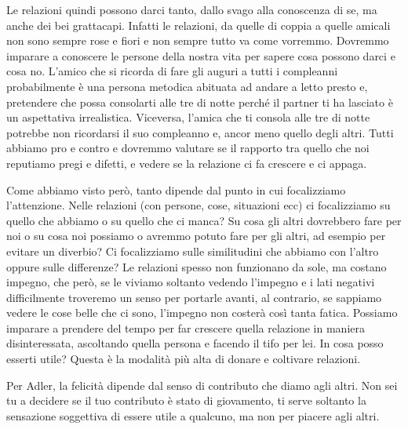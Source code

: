 \documentclass[12pt]{book} %
\begin{document}
\bigskip

Le relazioni quindi possono darci tanto, dallo svago alla conoscenza di se, ma anche dei bei grattacapi. Infatti le
relazioni, da quelle di coppia a quelle amicali non sono sempre rose e fiori e non sempre tutto va come vorremmo.
Dovremmo imparare a conoscere le persone della nostra vita per sapere cosa possono darci e cosa no.
L'amico che si ricorda di fare gli auguri a tutti i compleanni probabilmente è una persona
metodica abituata ad andare a letto presto e, pretendere che possa consolarti alle tre di notte perché il partner ti ha
lasciato è un aspettativa irrealistica. Viceversa, l'amica che ti consola alle tre di notte
potrebbe non ricordarsi il suo compleanno e, ancor meno quello degli altri. Tutti abbiamo pro e contro e dovremmo
valutare se il rapporto tra quello che noi reputiamo pregi e difetti, e vedere se la relazione ci fa crescere e ci
appaga.

Come abbiamo visto però, tanto dipende dal punto in cui focalizziamo l'attenzione. Nelle relazioni
(con persone, cose, situazioni ecc) ci focalizziamo su quello che abbiamo o su quello che ci manca? Su cosa gli altri
dovrebbero fare per noi o su cosa noi possiamo o avremmo potuto fare per gli altri, ad esempio per evitare un diverbio?
Ci focalizziamo sulle similitudini che abbiamo con l'altro oppure sulle differenze? Le relazioni spesso non funzionano
da sole, ma costano impegno, che però, se le viviamo soltanto vedendo l'impegno e i lati negativi
difficilmente troveremo un senso per portarle avanti, al contrario, se sappiamo vedere le cose belle che ci sono,
l'impegno non costerà così tanta fatica. Possiamo imparare a prendere del tempo per far crescere
quella relazione in maniera disinteressata, ascoltando quella persona e facendo il tifo per lei. In cosa posso esserti
utile? Questa è la modalità più alta di donare e coltivare relazioni.


\bigskip

Per Adler, la felicità dipende dal senso di contributo che diamo agli altri. Non sei tu a decidere se il tuo contributo
è stato di giovamento, ti serve soltanto la sensazione soggettiva di essere utile a qualcuno, ma non per piacere agli
altri.


\bigskip
\end{document}
